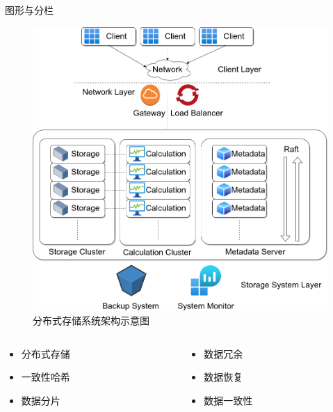 \documentclass[aspectratio=169]{beamer}
\begin{document}
\begin{frame}{图形与分栏}
    \begin{minipage}{0.5\textwidth}
        \begin{figure}[htpb]
            \centering
            \includegraphics[width=0.7\linewidth]{img/Example/SimpleDistributedStorageArchitecture.png}
            \caption{分布式存储系统架构示意图}
        \end{figure}
    \end{minipage}
    \hfill
    \begin{minipage}{0.4\textwidth}
        \begin{columns}[t]
            \begin{column}{0.5\textwidth}
                \begin{itemize}
                    \item 分布式存储
                    \item 一致性哈希
                    \item 数据分片
                \end{itemize}
            \end{column}
            \begin{column}{0.5\textwidth}
                \begin{itemize}
                    \item 数据冗余
                    \item 数据恢复
                    \item 数据一致性
                \end{itemize}
            \end{column}
        \end{columns}
    \end{minipage}
\end{frame}
\end{document}
